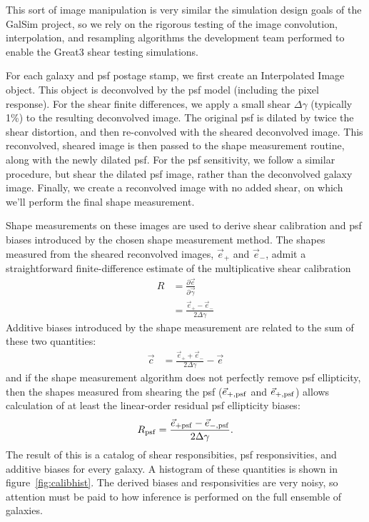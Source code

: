 \documentclass[iop]{emulateapj}
\begin{document}
This sort of image manipulation is very similar the simulation design goals of the GalSim  project, so we rely on the rigorous testing of the image convolution, interpolation, and resampling algorithms the development team performed to enable the Great3 shear testing simulations.

For each galaxy and psf postage stamp, we first create an Interpolated Image object. This object is deconvolved by the psf model (including the pixel response). For the shear finite differences, we apply a small shear $\Delta\gamma$ (typically 1\%) to the resulting deconvolved image. The original psf is dilated by twice the shear distortion, and then re-convolved with the sheared deconvolved image. This reconvolved, sheared image is then passed to the shape measurement routine, along with the newly dilated psf. For the psf sensitivity, we follow a similar procedure, but shear the dilated psf image, rather than the deconvolved galaxy image. Finally, we create a reconvolved image with no added shear, on which we'll perform the final shape measurement. 

Shape measurements on these images are used to derive shear calibration and psf biases {introduced by the chosen shape measurement method}. The shapes measured from the  sheared reconvolved images, $\vec{e}_{+}$ and $\vec{e}_{-}$, admit a straightforward finite-difference estimate of the multiplicative shear calibration
\begin{align}
R &= \frac{\partial \vec{e}}{\partial \vec{\gamma}}  \\
 &=\frac{\vec{e}_{+} - \vec{e}_{-}}{2\Delta\gamma}
\end{align}
Additive biases introduced by the shape measurement are related to the sum of these two quantities:
\begin{align}
\vec{c} &= \frac{\vec{e}_{+} + \vec{e}_{-}}{2 \Delta\gamma} - \vec{e}
\end{align}
and if the shape measurement algorithm does not perfectly remove psf ellipticity, then the shapes measured from shearing the psf ($\vec{e}_{+,\rm psf}$ and $\vec{e}_{+,\rm psf}$) allows calculation of at least the linear-order residual psf ellipticity biases:
\begin{align}
R_{\rm psf} = \frac{\vec{e}_{+\rm psf} - \vec{e}_{-,\rm psf}}{2\Delta\gamma}.
\end{align}
The result of this is a catalog of shear responsibities, psf responsivities, and additive biases for every galaxy. A histogram of these quantities is shown in figure~\ref{fig:calibhist}. The derived biases and responsivities are very noisy, so attention must be paid to how inference is performed on the full ensemble of galaxies.
\end{document}
